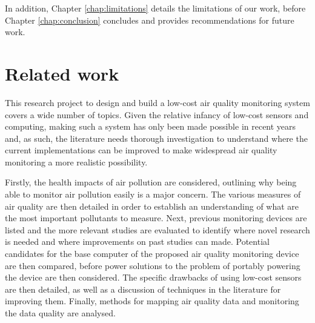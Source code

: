 \documentclass[11pt,twosided,a4paper]{report}
\begin{document}

In addition, Chapter \ref{chap:limitations} details the limitations of our work, before Chapter \ref{chap:conclusion} concludes and provides recommendations for future work.


\chapter{Related work} \label{chap: related_work}

This research project to design and build a low-cost air quality monitoring system covers a wide number of topics. Given the relative infancy of low-cost sensors and computing, making such a system has only been made possible in recent years and, as such, the literature needs thorough investigation to understand where the current implementations can be improved to make widespread air quality monitoring a more realistic possibility. 

Firstly, the health impacts of air pollution are considered, outlining why being able to monitor air pollution easily is a major concern. The various measures of air quality are then detailed in order to establish an understanding of what are the most important pollutants to measure. Next, previous monitoring devices are listed and the more relevant studies are evaluated to identify where novel research is needed and where improvements on past studies can made. Potential candidates for the base computer of the proposed air quality monitoring device are then compared, before power solutions to the problem of portably powering the device are then considered. The specific drawbacks of using low-cost sensors are then detailed, as well as a discussion of techniques in the literature for improving them. Finally, methods for mapping air quality data and monitoring the data quality are analysed. 
\end{document}
